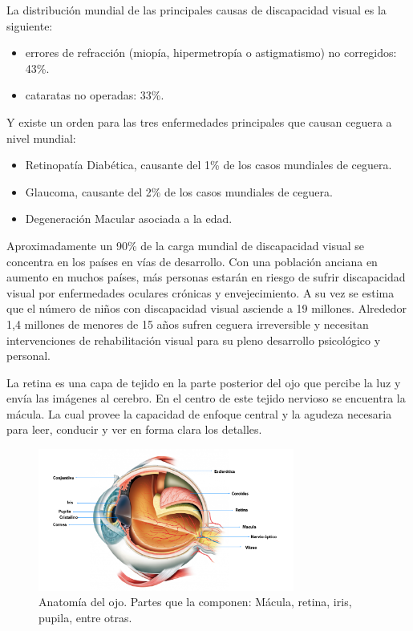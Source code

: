 La distribuci\'on mundial de las principales causas de discapacidad visual es la siguiente:
\begin{itemize}
\item errores de refracci\'on (miop\'ia, hipermetrop\'ia o astigmatismo) no corregidos: 43\%.
\item cataratas no operadas: 33\%.
\end{itemize}
Y existe un orden para las tres enfermedades principales que causan ceguera a nivel mundial:
\begin{itemize}
\item Retinopat\'ia Diab\'etica, causante del 1\% de los casos mundiales de ceguera.\cite{oms:cifraCegueraPorRetinopatia}
\item Glaucoma, causante del 2\% de los casos mundiales de ceguera.\cite{oms:cifras}
\item Degeneraci\'on Macular asociada a la edad.
\end{itemize}
Aproximadamente un 90\% de la carga mundial de discapacidad visual se concentra en los pa\'ises en v\'ias de desarrollo. Con una poblaci\'on anciana en aumento en muchos pa\'ises, m\'as personas estar\'an en riesgo de sufrir discapacidad visual por enfermedades oculares cr\'onicas y envejecimiento.
A su vez se estima que el n\'umero de niños con discapacidad visual asciende a 19 millones. Alrededor 1,4 millones de menores de 15 años sufren ceguera irreversible y necesitan intervenciones de rehabilitaci\'on visual para su pleno desarrollo psicol\'ogico y personal.


La retina es una capa de tejido en la parte posterior del ojo que percibe la luz y env\'ia las im\'agenes al cerebro. En el centro de este tejido nervioso se encuentra la m\'acula. La cual provee la capacidad de enfoque central y la agudeza necesaria para leer, conducir y ver en forma clara los detalles.

\begin{figure}[H]
	{
	\centering
	\includegraphics[width=0.75\textwidth]{Figures/anatomia-del-ojo}
	\caption[Anatom\'ia del ojo]{Anatom\'ia del ojo. Partes que la componen: M\'acula, retina, iris, pupila, entre otras.}
	\label{fig:AnatomiaDeOjo}
	}
\end{figure}

